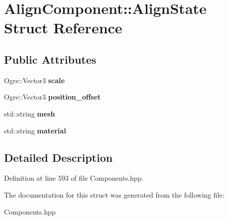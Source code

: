\hypertarget{struct_align_component_1_1_align_state}{}\section{Align\+Component\+:\+:Align\+State Struct Reference}
\label{struct_align_component_1_1_align_state}
\subsection*{Public Attributes}
\begin{DoxyCompactItemize}
\item 
Ogre\+::\+Vector3 {\bfseries scale}\hypertarget{struct_align_component_1_1_align_state_a23e6468e241f1efddf5e17883b8aa1ac}{}\label{struct_align_component_1_1_align_state_a23e6468e241f1efddf5e17883b8aa1ac}

\item 
Ogre\+::\+Vector3 {\bfseries position\+\_\+offset}\hypertarget{struct_align_component_1_1_align_state_a0b5fd1bff84997efe2f1a040d4c6506f}{}\label{struct_align_component_1_1_align_state_a0b5fd1bff84997efe2f1a040d4c6506f}

\item 
std\+::string {\bfseries mesh}\hypertarget{struct_align_component_1_1_align_state_aa3e812948ab2451b553844c6612325e7}{}\label{struct_align_component_1_1_align_state_aa3e812948ab2451b553844c6612325e7}

\item 
std\+::string {\bfseries material}\hypertarget{struct_align_component_1_1_align_state_ac80276905be3f5a6c6fc1f4afbb34420}{}\label{struct_align_component_1_1_align_state_ac80276905be3f5a6c6fc1f4afbb34420}

\end{DoxyCompactItemize}


\subsection{Detailed Description}


Definition at line 593 of file Components.\+hpp.



The documentation for this struct was generated from the following file\+:\begin{DoxyCompactItemize}
\item 
Components.\+hpp\end{DoxyCompactItemize}
